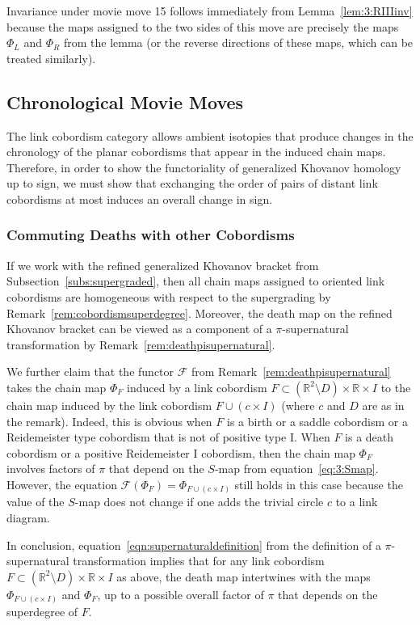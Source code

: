 \documentclass[12pt]{amsart}
\theoremstyle{definition}
\theoremstyle{plain}
\begin{document}
Invariance under movie move 15 follows immediately from Lemma~\ref{lem:3:RIIIinv} because the maps
assigned to the two sides of this move are precisely the maps $\Phi_L$ and $\Phi_R$ from the lemma
(or the reverse directions of these maps, which can be treated similarly).

\subsection{Chronological Movie Moves}

The link cobordism category allows ambient isotopies that produce changes in the chronology of the planar cobordisms that appear in the induced chain maps.  Therefore, in order to show the functoriality of generalized Khovanov homology up to sign, we must show that exchanging the order of pairs of distant link cobordisms at most induces an overall change in sign.

\subsubsection {Commuting Deaths with other Cobordisms}
If we work with the refined generalized Khovanov bracket from
Subsection~\ref{subs:supergraded}, then all chain maps
assigned to oriented link cobordisms are homogeneous with respect
to the supergrading by Remark~\ref{rem:cobordismsuperdegree}.
Moreover, the death map on the refined Khovanov bracket can be
viewed as a component of a $\pi$-supernatural transformation
by Remark~\ref{rem:deathpisupernatural}. 

We further claim that
 the functor $\mathcal{F}$ from Remark~\ref{rem:deathpisupernatural}
 takes the chain map $\Phi_F$ induced by a link cobordism
$F\subset(\mathbb{R}^2\setminus D)\times\mathbb{R}\times I$ to the chain map induced by the link cobordism $F\cup (c\times I)$
(where $c$ and $D$ are as in the remark).
Indeed, this is obvious when $F$ is a birth or a saddle cobordism or a Reidemeister type cobordism
that is not of positive type I. When $F$ is a death cobordism or a positive Reidemeister I cobordism,
then the chain map $\Phi_F$ involves factors of $\pi$ that depend on
the $S$-map from equation~\eqref{eq:3:Smap}. However, the equation
$\mathcal{F}(\Phi_F)=\Phi_{F\cup(c\times I)}$
still holds in this case because the value of the $S$-map does not change if one adds the trivial circle $c$ to a link diagram.

In conclusion,
equation~\eqref{eqn:supernaturaldefinition} from the definition
of a $\pi$-supernatural transformation 
implies that for any link cobordism $F\subset(\mathbb{R}^2\setminus D)\times\mathbb{R}\times I$ as above,
the death map intertwines with the maps $\Phi_{F\cup(c\times I)}$ and $\Phi_F$, up to a possible overall factor of $\pi$ that depends
on the superdegree of $F$.
\end{document}
